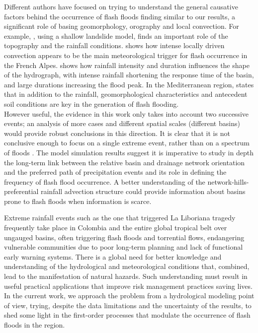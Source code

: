 \documentclass[hess, manuscript]{copernicus}
\begin{document}
Different authors have focused on trying to understand the general causative factors behind the occurrence of flash floods finding similar to our results, a significant role of basing geomorphology, orography and local convection. For example, \citet{Lehmann2012}, using a shallow landslide model, finds an important role of the topography and the rainfall conditions.  \citet{Turkington2014} shows how intense locally driven convection appears to be the main meteorological trigger for flash occurrence in the French Alpes.\citet{Camarasa2016} shows how rainfall intensity and duration influences the shape of the hydrograph, with intense rainfall shortening the response time of the basin, and large durations increasing the flood peak. In the Mediterranean region, \citet{Boudou2016}  states that in addition to the rainfall, geomorphological characteristics and antecedent soil conditions are key in the generation of flash flooding.\\

However useful, the evidence in this work only takes into account two successive events; an analysis of more cases and different spatial scales (different basins) would provide robust conclusions in this direction. It is clear that it is not conclusive enough to focus on a single extreme event, rather than on a spectrum of floods \cite{Merz2003}.  The model simulation results suggest it is imperative to study in depth the long-term link between the relative basin and drainage network orientation and the preferred path of precipitation events and its role in defining the frequency of flash flood occurrence. A better understanding of the network-hills-preferential rainfall advection structure could provide information about basins prone to flash floods when information is scarce.\\


\conclusions[Conclusions]
\label{sec:conclusions}

Extreme rainfall events such as the one that triggered La Liboriana tragedy frequently take place in Colombia and the entire global tropical belt over ungauged basins, often triggering flash floods and torrential flows, endangering vulnerable communities due to poor long-term planning and lack of functional early warning systems. There is a global need for better knowledge and understanding of the hydrological and meteorological conditions that, combined, lead to the manifestation of natural hazards. Such understanding must result in useful practical applications that improve risk management practices saving lives. In the current work, we approach the problem from a hydrological modeling point of view, trying, despite the data limitations and the uncertainty of the results, to shed some light in the first-order processes that modulate the occurrence of flash floods in the region.  \\  
\end{document}

